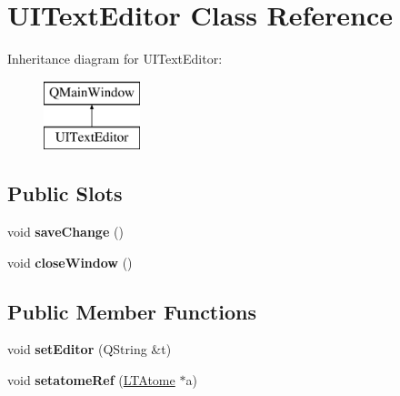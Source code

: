 \hypertarget{class_u_i_text_editor}{}\section{U\+I\+Text\+Editor Class Reference}
\label{class_u_i_text_editor}
Inheritance diagram for U\+I\+Text\+Editor\+:\begin{figure}[H]
\begin{center}
\leavevmode
\includegraphics[height=2.000000cm]{class_u_i_text_editor}
\end{center}
\end{figure}
\subsection*{Public Slots}
\begin{DoxyCompactItemize}
\item 
void {\bfseries save\+Change} ()\hypertarget{class_u_i_text_editor_a326840aff747518291263eac3147ad76}{}\label{class_u_i_text_editor_a326840aff747518291263eac3147ad76}

\item 
void {\bfseries close\+Window} ()\hypertarget{class_u_i_text_editor_a001c426de8862e8df403c46f7be6bbb2}{}\label{class_u_i_text_editor_a001c426de8862e8df403c46f7be6bbb2}

\end{DoxyCompactItemize}
\subsection*{Public Member Functions}
\begin{DoxyCompactItemize}
\item 
void {\bfseries set\+Editor} (Q\+String \&t)\hypertarget{class_u_i_text_editor_aa7a1e5d50677109ecb14390a1a778614}{}\label{class_u_i_text_editor_aa7a1e5d50677109ecb14390a1a778614}

\item 
void {\bfseries setatome\+Ref} (\hyperlink{class_l_t_atome}{L\+T\+Atome} $\ast$a)\hypertarget{class_u_i_text_editor_aa1515696a4d2111dbb53cdaf54296d0f}{}\label{class_u_i_text_editor_aa1515696a4d2111dbb53cdaf54296d0f}

\end{DoxyCompactItemize}
